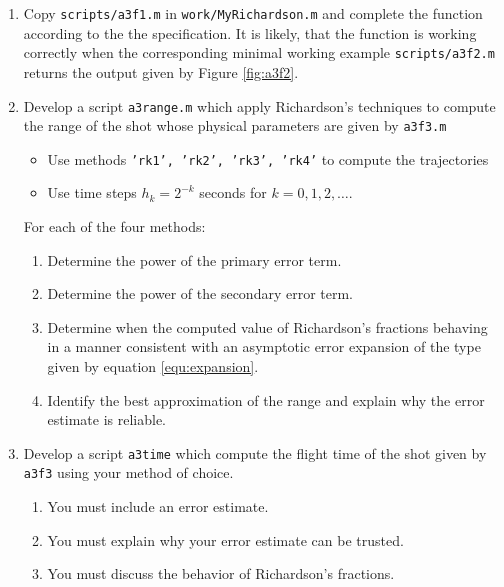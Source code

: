 \documentclass[a4paper,12pt]{article}
\begin{document}
\begin{enumerate}
\item Copy {\tt scripts/a3f1.m} in {\tt work/MyRichardson.m} and complete the function according to the the specification. It is likely, that the function is working correctly when the corresponding minimal working example {\tt scripts/a3f2.m} returns the output given by Figure \ref{fig:a3f2}.


\item \label{q:range} Develop a script {\tt a3range.m} which apply Richardson's techniques to compute the range of the shot whose physical parameters are given by {\tt a3f3.m}

  \begin{itemize}
  \item Use methods {\tt 'rk1', 'rk2', 'rk3', 'rk4'} to compute the trajectories
  \item Use time steps $h_k = 2^{-k}$ seconds for $k=0,1,2,\dotsc$.
  \end{itemize}
  For each of the four methods:
  \begin{enumerate}
  \item Determine the power of the primary error term.
  \item Determine the power of the secondary error term.
  \item Determine when the computed value of Richardson's fractions behaving in a manner consistent with an asymptotic error expansion of the type given by equation \eqref{equ:expansion}.
  \item Identify the best approximation of the range and explain why the error estimate is reliable.
  \end{enumerate}

\item \label{q:time} Develop a script {\tt a3time} which compute the flight time of the shot given by {\tt a3f3} using your method of choice.
  \begin{enumerate}
  \item You must include an error estimate.
  \item You must explain why your error estimate can be trusted.
  \item You must discuss the behavior of Richardson's fractions.
  \end{enumerate}


\end{enumerate}
\end{document}
